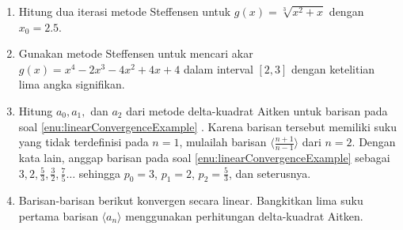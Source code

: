 \begin{enumerate}
\begin{enumerate}
\item Tentukan batas bagi banyaknya iterasi yang diperlukan untuk mencapai
ketelitian $10^{-2}$, menggunakan iterasi titik tetap dengan sembarang
nilai awal dalam $[0,2\pi]$. 
\item Gunakan iterasi titik tetap dengan $x_{0}=0$ untuk mencari hampiran
titik tetap dengan galat tidak lebih dari $10^{-2}$. Titik tetapnya
adalah $x=???$.
\item Bandingkan batas tersebut dengan banyaknya iterasi yang sebenarnya
diperlukan.
\end{enumerate}
\item \label{exc:orderOfConvergence-4}Hitung dua iterasi metode Steffensen
untuk $g(x)=\sqrt[3]{x^{2}+x}$ dengan $x_{0}=2.5$.  \hasananswer 
\item \label{exc:orderOfConvergence-5}Gunakan metode Steffensen untuk mencari
akar $g(x)=x^{4}-2x^{3}-4x^{2}+4x+4$ dalam interval $[2,3]$ dengan
ketelitian lima angka signifikan. \hasananswer 
\item \label{enu:aitkensOnSequence}Hitung $a_{0},a_{1},$ dan $a_{2}$
dari metode delta-kuadrat Aitken untuk barisan pada soal \ref{enu:linearConvergenceExample}
. Karena barisan tersebut
memiliki suku yang tidak terdefinisi pada $n=1$, mulailah barisan
$\langle\frac{n+1}{n-1}\rangle$ dari $n=2$. Dengan kata lain, anggap
barisan pada soal \ref{enu:linearConvergenceExample} 
sebagai $3,2,\frac{5}{3},\frac{3}{2},\frac{7}{5}\ldots$ sehingga
$p_{0}=3$, $p_{1}=2$, $p_{2}=\frac{5}{3}$, dan seterusnya.
\item Barisan-barisan berikut konvergen secara linear. Bangkitkan lima suku
pertama barisan $\langle a_{n}\rangle$ menggunakan perhitungan delta-kuadrat
Aitken.


\end{enumerate}
